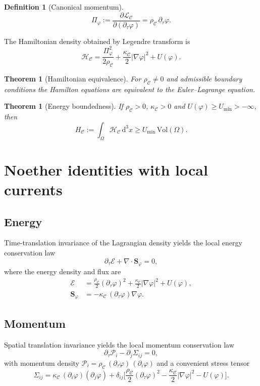 \documentclass[11pt,a4paper]{article}
\newtheorem{definition}[axiom]{Definition}
\newtheorem{theorem}[axiom]{Theorem}
\newcommand{\C}{\mathcal{C}}
\renewcommand{\dd}{\mathrm{d}}
\newcommand{\Lag}{\mathcal{L}}
\newcommand{\Ham}{\mathcal{H}}
\newcommand{\rhoC}{\rho_{\mathcal{C}}}
\newcommand{\kC}{\kappa_{\mathcal{C}}}
\newcommand{\Boxed}[1]{\boxed{\displaystyle #1}}
\begin{document}
\begin{definition}[Canonical momentum]
\[
\Pi_\varphi:=\frac{\partial\Lag_{\C}}{\partial(\partial_\tau\varphi)}=\rhoC\,\partial_\tau\varphi.
\]
\end{definition}

The Hamiltonian density obtained by Legendre transform is
\[
\Boxed{\Ham_{\C}=\frac{\Pi_\varphi^2}{2\rhoC}+\frac{\kC}{2}|\nabla\varphi|^2+U(\varphi).}
\]

\begin{theorem}[Hamiltonian equivalence]
For \(\rhoC\neq0\) and admissible boundary conditions the Hamilton equations are equivalent to the Euler--Lagrange equation.
\end{theorem}

\begin{theorem}[Energy boundedness]
If \(\rhoC>0\), \(\kC>0\) and \(U(\varphi)\ge U_{\min}>-\infty\), then
\[
H_{\mathcal C}:=\int_\Omega\Ham_{\C}\,\dd^3x\ge U_{\min}\,\mathrm{Vol}(\Omega).
\]
\end{theorem}

\section{Noether identities with local currents}

\subsection{Energy}

Time-translation invariance of the Lagrangian density yields the local energy conservation law
\[
\Boxed{\partial_\tau\mathcal{E}+\nabla\cdot\mathbf{S}_\varphi=0,}
\]
where the energy density and flux are
\begin{align}
\mathcal{E}&=\frac{\rhoC}{2}(\partial_\tau\varphi)^2+\frac{\kC}{2}|\nabla\varphi|^2+U(\varphi),\\
\mathbf{S}_\varphi&=-\kC\,(\partial_\tau\varphi)\nabla\varphi.
\end{align}

\subsection{Momentum}

Spatial translation invariance yields the local momentum conservation law
\[
\Boxed{\partial_\tau\mathcal{P}_i-\partial_j\Sigma_{ij}=0,}
\]
with momentum density \(\mathcal{P}_i=\rhoC\,(\partial_\tau\varphi)\,(\partial_i\varphi)\) and a convenient stress tensor
\begin{equation}
\Sigma_{ij}=\kC\,(\partial_i\varphi)(\partial_j\varphi)+\delta_{ij}\Biggl[\frac{\rhoC}{2}(\partial_\tau\varphi)^2-\frac{\kC}{2}|\nabla\varphi|^2-U(\varphi)\Biggr].
\end{equation}
\end{document}
